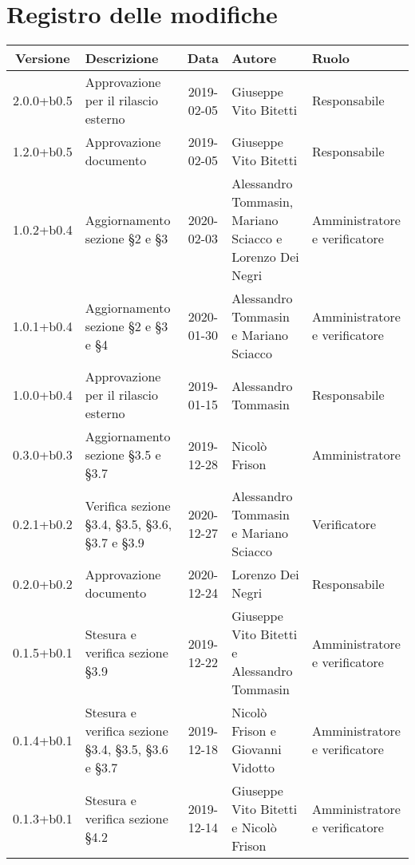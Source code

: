 \section*{Registro delle modifiche}

\begin{center}
	\begin{longtable}{|c|p{3cm}|c|p{4cm}|p{2.5cm}|}
	\hline
	\rowcolor{lighter-grayer}
	\textbf{Versione} & \textbf{Descrizione} & \textbf{Data} & \textbf{Autore} & \textbf{Ruolo} \\
	\hline
	\endfirsthead



	2.0.0+b0.5 & Approvazione per il rilascio esterno & 2019-02-05 & Giuseppe Vito Bitetti & Responsabile \\
	\hline
	1.2.0+b0.5 & Approvazione documento & 2019-02-05 & Giuseppe Vito Bitetti & Responsabile \\
	\hline
	1.0.2+b0.4 & Aggiornamento sezione \S2 e \S3 & 2020-02-03 & Alessandro Tommasin, Mariano Sciacco e Lorenzo Dei Negri & Amministratore e verificatore \\
	\hline
	1.0.1+b0.4 & Aggiornamento sezione \S2 e \S3 e \S4 & 2020-01-30 & Alessandro Tommasin e Mariano Sciacco & Amministratore e verificatore \\
	\hline
	1.0.0+b0.4 & Approvazione per il rilascio esterno & 2019-01-15 & Alessandro Tommasin & Responsabile \\
	\hline
	0.3.0+b0.3 & Aggiornamento sezione \S3.5 e \S3.7 & 2019-12-28 & Nicolò Frison & Amministratore \\
	\hline
	0.2.1+b0.2 & Verifica sezione \S3.4, \S3.5, \S3.6, \S3.7 e \S3.9 & 2020-12-27 & Alessandro Tommasin e Mariano Sciacco & Verificatore\\
  \hline
	0.2.0+b0.2 & Approvazione documento & 2020-12-24 & Lorenzo Dei Negri & Responsabile \\
	\hline
	0.1.5+b0.1 & Stesura e verifica sezione \S3.9 & 2019-12-22 & Giuseppe Vito Bitetti e Alessandro Tommasin  & Amministratore e verificatore \\
	\hline
	0.1.4+b0.1 & Stesura e verifica sezione \S3.4, \S3.5, \S3.6 e \S3.7 & 2019-12-18 & Nicolò Frison e Giovanni Vidotto & Amministratore e verificatore \\
	\hline
	0.1.3+b0.1 & Stesura e verifica sezione \S4.2 & 2019-12-14 & Giuseppe Vito Bitetti e Nicolò Frison & Amministratore e verificatore \\
	\hline

\end{longtable}
\end{center}
